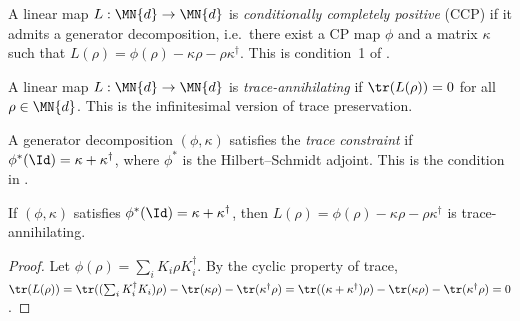 \begin{definition}\label{def:is_ccp}
    \leanok
    A linear map $L : \MN{d} \to \MN{d}$ is \emph{conditionally
        completely positive} (CCP) if it admits a generator decomposition,
    i.e.\ there exist a CP map $\phi$ and a matrix $\kappa$ such that
    $L(\rho) = \phi(\rho) - \kappa\rho - \rho\kappa^\dagger$.
    This is condition~1 of \cite[Proposition~7.2]{Wolf2012Quantum}.
\end{definition}

\begin{definition}\label{def:is_trace_annihilating}
    \leanok
    A linear map $L : \MN{d} \to \MN{d}$ is \emph{trace-annihilating} if
    $\tr(L(\rho)) = 0$ for all $\rho \in \MN{d}$.
    This is the infinitesimal version of trace preservation.
\end{definition}

\begin{definition}\label{def:is_trace_constraint}
    \leanok
    A generator decomposition $(\phi, \kappa)$ satisfies the
    \emph{trace constraint} if $\phi^*(\Id) = \kappa + \kappa^\dagger$,
    where $\phi^*$ is the Hilbert--Schmidt adjoint.
    This is the condition in \cite[Equation~(7.20)]{Wolf2012Quantum}.
\end{definition}

\begin{theorem}
    \label{thm:traceAnnihilating_of_traceConstraint}
    \leanok
    If $(\phi, \kappa)$ satisfies $\phi^*(\Id) = \kappa + \kappa^\dagger$,
    then $L(\rho) = \phi(\rho) - \kappa\rho - \rho\kappa^\dagger$ is
    trace-annihilating.
\end{theorem}

\begin{proof}
    \leanok
    Let $\phi(\rho) = \sum_i K_i \rho K_i^\dagger$.
    By the cyclic property of trace,
    $\tr(L(\rho))
        = \tr((\sum_i K_i^\dagger K_i)\rho)
        - \tr(\kappa\rho)
        - \tr(\kappa^\dagger\rho)
        = \tr((\kappa + \kappa^\dagger)\rho)
        - \tr(\kappa\rho) - \tr(\kappa^\dagger\rho) = 0$.
\end{proof}

